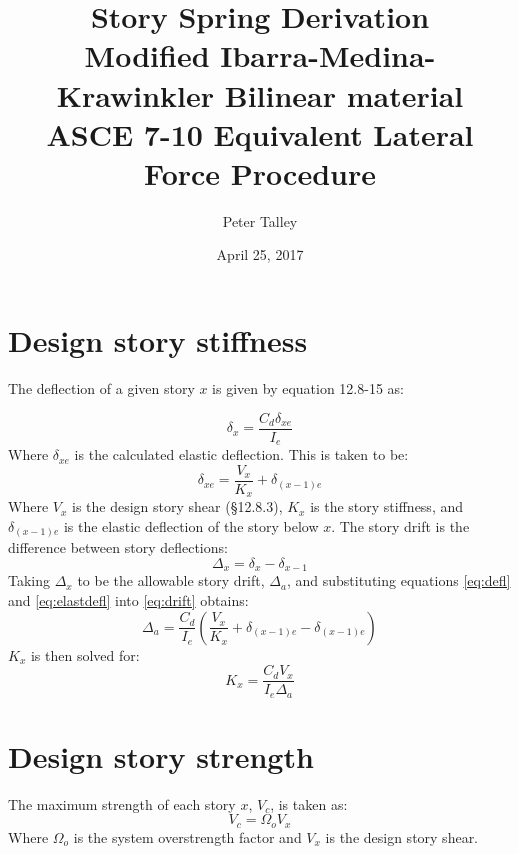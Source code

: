 \documentclass[11pt,letterpaper]{article}
\title{Story Spring Derivation \\
       \vspace{0.5em}
       \large Modified Ibarra-Medina-Krawinkler Bilinear material\\
       \vspace{0.5em}
       \large ASCE 7-10 Equivalent Lateral Force Procedure}
\author{Peter Talley}
\date{April 25, 2017}
\begin{document}
\maketitle

\section{Design story stiffness}
The deflection of a given story $x$ is given by equation 12.8-15 as:

\begin{equation} \label{eq:defl}
    \delta_x = \frac{C_d \delta_{xe}}{I_e}
\end{equation}
Where $\delta_{xe}$ is the calculated elastic deflection. This is taken to be:
\begin{equation} \label{eq:elastdefl}
	\delta_{xe} = \frac{V_x}{K_x} + \delta_{(x-1)e}
\end{equation}
Where $V_x$ is the design story shear (\S 12.8.3), $K_x$ is the story stiffness, and $\delta_{(x-1)e}$ is the elastic deflection of the story below $x$. The story drift is the difference between story deflections:
\begin{equation} \label{eq:drift}
	\Delta_x = \delta_x - \delta_{x-1}
\end{equation}
Taking $\Delta_x$ to be the allowable story drift, $\Delta_a$, and substituting equations \eqref{eq:defl} and \eqref{eq:elastdefl} into \eqref{eq:drift} obtains:
\begin{equation} \label{eq:driftsubs}
	\Delta_a = \frac{C_d}{I_e} \left(\frac{V_x}{K_x}+\delta_{(x-1)e}-\delta_{(x-1)e}\right)
\end{equation}
$K_x$ is then solved for:
\begin{equation} \label{eq:stiffness}
    K_x = \frac{C_d V_x}{I_e \Delta_a}
\end{equation}

\section{Design story strength}
The maximum strength of each story $x$, $V_c$, is taken as:
\begin{equation}
  V_{c} = Ω_o V_x
\end{equation}
Where $Ω_o$ is the system overstrength factor and $V_x$ is the design story shear.
\end{document}
